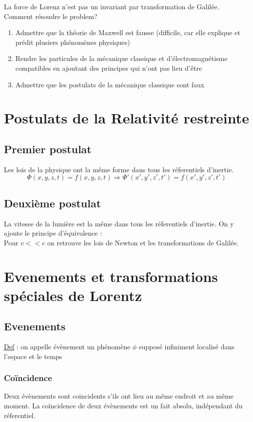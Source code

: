 \documentclass{article}
\begin{document}
La force de Lorenz n'est pas un invariant par transformation de Galilée.\\
Comment résoudre le problem?
\begin{enumerate}
    \item Admettre que la théorie de Maxwell est fausse (difficile, car elle explique et prédit plusiers phénomènes physiques)
    \item Rendre les particules de la mécanique classique et d'électromagnétisme compatibles en ajoutant des principes qui n'ont pas lieu d'être
    \item Admettre que les postulats de la mécanique classique sont faux
\end{enumerate}
\section{Postulats de la Relativité restreinte}
\subsection{Premier postulat}
Les lois de la physique ont la même forme dans tous les réferentiels d'inertie.
\begin{equation*}
    \Phi(x,y,z,t) = f(x,y,z,t) \Rightarrow \Phi'(x',y',z',t') = f(x',y',z',t')
\end{equation*}
\subsection{Deuxième postulat}
La vitesse de la lumière est la même dans tous les réferentiels d'inertie. On y ajoute le principe d'équivalence :\\
Pour $v<<c$ on retrouve les lois de Newton et les transformations de Galilée.\\
\section{Evenements et transformations spéciales de Lorentz} 
\subsection{Evenements}
\underline{Def} : on appelle évènement un phénomène $\phi$ supposé infiniment localisé dans l'espace et le temps
\subsubsection{Coïncidence}
Deux évènements sont coincidents s'ils ont lieu au même endroit et au même moment. La coïncidence de deux évènements est un fait absolu, indépendant du réferentiel.
\end{document}
